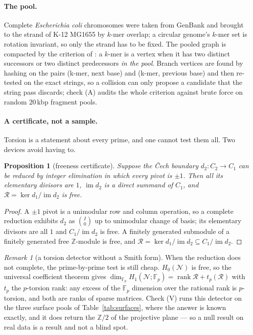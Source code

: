 \documentclass[11pt]{article}
\theoremstyle{plain}
\newtheorem{proposition}[theorem]{Proposition}
\theoremstyle{definition}
\theoremstyle{remark}
\newtheorem{remark}[theorem]{Remark}
\newcommand{\Z}{\mathbb{Z}}
\newcommand{\rank}{\operatorname{rank}}
\newcommand{\im}{\operatorname{im}}
\newcommand{\Rec}{\mathcal{R}}
\newcommand{\Nerve}{\mathcal{N}}
\begin{document}
\paragraph{The pool.} Complete \emph{Escherichia coli} chromosomes were taken from GenBank
and brought to the strand of K-12 MG1655 by $k$-mer overlap; a circular genome's $k$-mer set
is rotation invariant, so only the strand has to be fixed. The pooled graph is compacted by
the criterion of \cite{Bio9}: a $k$-mer is a vertex when it has two distinct successors or
two distinct predecessors \emph{in the pool}. Branch vertices are found by hashing on the
pairs (k-mer, next base) and (k-mer, previous base) and then re-tested on the exact strings,
so a collision can only propose a candidate that the string pass discards; check (A) audits
the whole criterion against brute force on random $20$\,kbp fragment pools.

\paragraph{A certificate, not a sample.} Torsion is a statement about every prime, and one
cannot test them all. Two devices avoid having to.

\begin{proposition}[freeness certificate]\label{prop:cert}
Suppose the \v Cech boundary $d_2\colon C_2\to C_1$ can be reduced by integer elimination in
which every pivot is $\pm1$. Then all its elementary divisors are $1$, $\im d_2$ is a direct
summand of $C_1$, and $\Rec=\ker d_1/\im d_2$ is free.
\end{proposition}

\begin{proof}
A $\pm1$ pivot is a unimodular row and column operation, so a complete reduction exhibits
$d_2$ as $\binom{I}{0}$ up to unimodular change of basis; its elementary divisors are all
$1$ and $C_1/\im d_2$ is free. A finitely generated submodule of a finitely generated free
$\Z$-module is free, and $\Rec=\ker d_1/\im d_2\subseteq C_1/\im d_2$.
\end{proof}

\begin{remark}[a torsion detector without a Smith form]\label{rem:detector}
When the reduction does not complete, the prime-by-prime test is still cheap. $H_0(\Nerve)$
is free, so the universal coefficient theorem gives
$\dim_{\mathbb F_p}H_1(\Nerve;\mathbb F_p)=\rank\Rec+t_p(\Rec)$ with $t_p$ the $p$-torsion
rank: any excess of the $\mathbb F_p$ dimension over the rational rank is $p$-torsion, and
both are ranks of sparse matrices. Check (V) runs this detector on the three surface pools of
Table~\ref{tab:surfaces}, where the answer is known exactly, and it does return the $\Z/2$ of
the projective plane --- so a null result on real data is a result and not a blind spot.
\end{remark}
\end{document}
